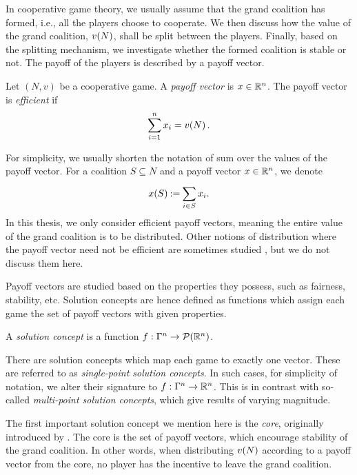 In cooperative game theory, we usually assume that the grand coalition has formed, i.e., all the players choose to cooperate.
We then discuss how the value of the grand coalition, $ v\!\left(N\right) $, shall be split between the players.
Finally, based on the splitting mechanism, we investigate whether the formed coalition is stable or not.
The payoff of the players is described by a payoff vector.

\begin{defi}
	Let $ \left( N,v \right) $ be a cooperative game.
	A \emph{payoff vector} is $ x \in \mathbb{R}^n $.
	The payoff vector is \emph{efficient} if \[
		\sum_{i = 1}^{n} x_i = v\!\left(N\right).
	\]
\end{defi}

For simplicity, we usually shorten the notation of sum over the values of the payoff vector.
For a coalition $ S \subseteq N $ and a payoff vector $ x \in \mathbb{R}^n $, we denote \[
	x\!\left(S\right) \mathbin{:=} \sum_{i \in S}^{} x_i.
\]
In this thesis, we only consider efficient payoff vectors, meaning the entire value of the grand coalition is to be distributed.
Other notions of distribution where the payoff vector need not be efficient are sometimes studied \citep{aumann74coop,bachrach2009cost}, but we do not discuss them here. 

Payoff vectors are studied based on the properties they possess, such as fairness, stability, etc.
Solution concepts are hence defined as functions which assign each game the set of payoff vectors with given properties.

\begin{defi}
	A \emph{solution concept} is a function $ f: \Gamma^{n} \to \mathcal{P}\!\left(\mathbb{R}^n\right) $.
\end{defi}

There are solution concepts which map each game to exactly one vector.
These are referred to as \emph{single-point solution concepts}.
In such cases, for simplicity of notation, we alter their signature to $ f: \Gamma^{n} \to \mathbb{R}^n $.
This is in contrast with so-called \emph{multi-point solution concepts}, which give results of varying magnitude.

The first important solution concept we mention here is the \emph{core}, originally introduced by \cite{Gillies1959}.
The core is the set of payoff vectors, which encourage stability of the grand coalition.
In other words, when distributing $ v\!\left(N\right) $ according to a payoff vector from the core, no player has the incentive to leave the grand coalition.

